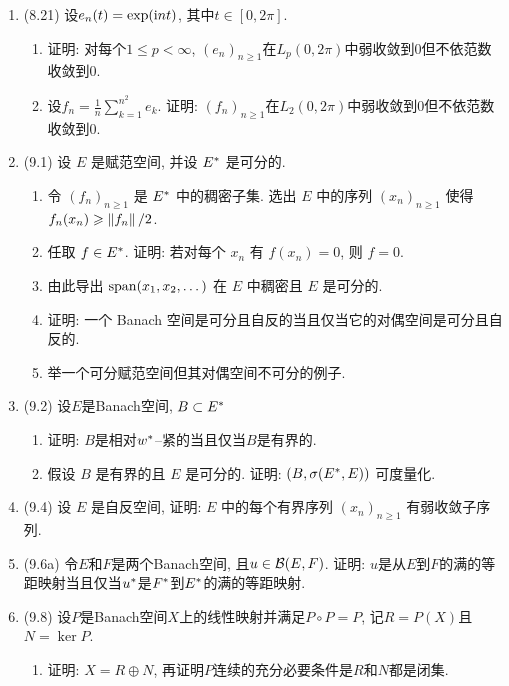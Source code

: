 \begin{enumerate}[label=\textbf{\arabic*.}, ref=\arabic*]
\begin{enumerate}[(1)]
\begin{enumerate}[(i)]
				\end{enumerate}
			\end{enumerate}
		\item (8.21) 设$ e_n(t)=\exp(\mathrm{i} nt) $, 其中$ t\in[0,2\pi] $.
		\begin{enumerate}[(1)]
			\item 证明: 对每个$ 1\leqslant p<\infty $, $ (e_n)_{n\geqslant 1} $在$ L_p(0,2\pi) $中弱收敛到0但不依范数收敛到0.
			\item 设$ f_n=\frac{1}{n}\sum\limits_{k=1}^{n^2}e_k $. 证明: $ (f_n)_{n\geqslant 1} $在$ L_2(0,2\pi) $中弱收敛到0但不依范数收敛到0.
		\end{enumerate}
		\item (9.1) 设 $ E $ 是赋范空间, 并设 $ E^{*} $ 是可分的.
		\begin{enumerate}[(1)]
			\item 令 $ (f_{n})_{n\geqslant1} $ 是 $ E^{*} $ 中的稠密子集. 选出 $ E $ 中的序列 $ (x_{n})_{n\geqslant1} $ 使得 $ f_{n}(x_{n})\geqslant \left\| f_{n} \right\|/2 $.
			\item 任取 $ f\in E^{*} $. 证明: 若对每个 $ x_{n} $ 有 $ f(x_{n})=0 $, 则 $ f=0 $. 
			\item 由此导出 $ \operatorname{span}(x_{1}, x_{2}, \dots) $ 在 $ E $ 中稠密且 $ E $ 是可分的.
			\item 证明: 一个 Banach 空间是可分且自反的当且仅当它的对偶空间是可分且自反的.
			\item 举一个可分赋范空间但其对偶空间不可分的例子. 
		\end{enumerate}
		\item (9.2) 设$ E $是Banach空间, $ B\subset E^{*} $
		\begin{enumerate}[(1)]
			\item 证明: $ B $是相对$ w^{*} $--紧的当且仅当$ B $是有界的.
			\item 假设 $ B $ 是有界的且 $ E $ 是可分的. 证明: $ (B, \sigma(E^{*}, E)) $ 可度量化.
		\end{enumerate}
		\item (9.4) 设 $ E $ 是自反空间, 证明: $ E $ 中的每个有界序列 $ (x_{n})_{n\geqslant1} $ 有弱收敛子序列.
		\item (9.6a) 令$ E $和$ F $是两个Banach空间, 且$ u\in\mathcal{B}(E,F) $. 证明: $ u $是从$ E $到$ F $的满的等距映射当且仅当$ u^{*} $是$ F^{*} $到$ E^{*} $的满的等距映射.
		\item (9.8) 设$ P $是Banach空间$ X $上的线性映射并满足$ P\circ P=P $, 记$ R=P(X) $且$ N=\ker P $.
		\begin{enumerate}[(1)]
			\item 证明: $ X=R\oplus N $, 再证明$ P $连续的充分必要条件是$ R $和$ N $都是闭集.

\end{enumerate}
\end{enumerate}
